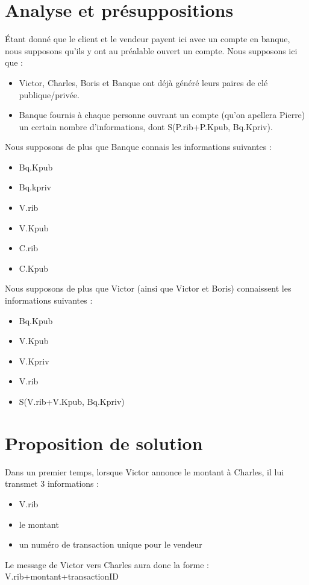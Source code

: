 \documentclass[oneside,10pt]{article}
\begin{document}
\section{Analyse et pr\'esuppositions}
\'Etant donn\'e que le client et le vendeur payent ici avec un compte en banque, nous supposons qu'ils y ont au pr\'ealable ouvert un compte. Nous supposons ici que :
\begin{itemize}
\item Victor, Charles, Boris et Banque ont d\'ej\`a g\'en\'er\'e leurs paires de cl\'e publique/priv\'ee.
\item Banque fournis \`a chaque personne ouvrant un compte (qu'on apellera Pierre) un certain nombre d'informations, dont S(P.rib+P.Kpub, Bq.Kpriv).
\end{itemize}
Nous supposons de plus que Banque connais les informations suivantes :
\begin{itemize}
\item Bq.Kpub
\item Bq.kpriv
\item V.rib
\item V.Kpub
\item C.rib
\item C.Kpub
\end{itemize}
Nous supposons de plus que Victor (ainsi que Victor et Boris) connaissent les informations suivantes :
\begin{itemize}
\item Bq.Kpub
\item V.Kpub
\item V.Kpriv
\item V.rib
\item S(V.rib+V.Kpub, Bq.Kpriv)
\end{itemize}

\section{Proposition de solution}
Dans un premier temps, lorsque Victor annonce le montant \`a Charles, il lui transmet 3 informations :
\begin{itemize}
\item V.rib
\item le montant
\item un num\'ero de transaction unique pour le vendeur
\end{itemize}
Le message de Victor vers Charles aura donc la forme :\\V.rib+montant+transactionID
\end{document}
